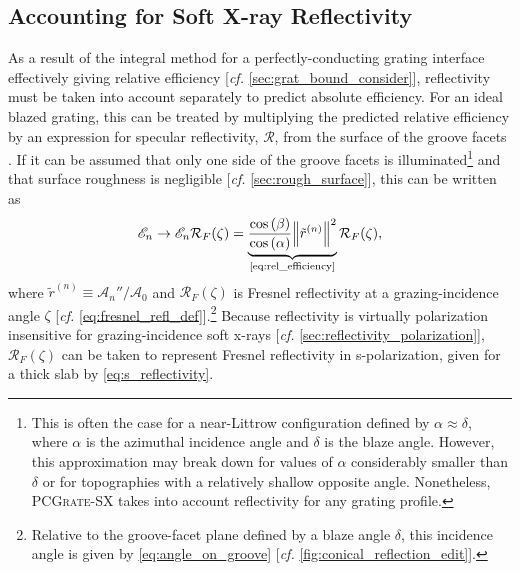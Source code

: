 \subsection{Accounting for Soft X-ray Reflectivity}\label{sec:refl_account} 
As a result of the integral method for a perfectly-conducting grating interface effectively giving relative efficiency [\emph{cf.\@} \cref{sec:grat_bound_consider}], reflectivity must be taken into account separately to predict absolute efficiency. 
For an ideal blazed grating, this can be treated by multiplying the predicted relative efficiency by an expression for specular reflectivity, $\mathcal{R}$, from the surface of the groove facets \cite{antonakakis14}. 
If it can be assumed that only one side of the groove facets is illuminated\footnote{This is often the case for a near-Littrow configuration defined by $\alpha \approx \delta$, where $\alpha$ is the azimuthal incidence angle and $\delta$ is the blaze angle. However, this approximation may break down for values of $\alpha$ considerably smaller than $\delta$ or for topographies with a relatively shallow opposite angle. Nonetheless, \textsc{PCGrate-SX} takes into account reflectivity for any grating profile.} and that surface roughness is negligible [\emph{cf.\@} \cref{sec:rough_surface}], this can be written as 
\begin{equation}\label{eq:absolute_eff_approx}
 \mathscr{E}_n \to \mathscr{E}_n \mathcal{R}_F (\zeta) = \underbrace{\frac{\cos \left( \beta \right)}{\cos \left( \alpha \right)} \norm{\tilde{r}^{(n)}}^2}_{\text{\cref{eq:rel_efficiency}}} \mathcal{R}_F (\zeta) ,
 \end{equation}
where $\tilde{r}^{(n)} \equiv \mathcal{A}_n'' / \mathcal{A}_0$ and $\mathcal{R}_F (\zeta)$ is Fresnel reflectivity at a grazing-incidence angle $\zeta$ [\emph{cf.\@} \cref{eq:fresnel_refl_def}].\footnote{Relative to the groove-facet plane defined by a blaze angle $\delta$, this incidence angle is given by \cref{eq:angle_on_groove} [\emph{cf.\@} \cref{fig:conical_reflection_edit}].} 
Because reflectivity is virtually polarization insensitive for grazing-incidence soft x-rays [\emph{cf.\@} \cref{sec:reflectivity_polarization}], $\mathcal{R}_F (\zeta)$ can be taken to represent Fresnel reflectivity in s-polarization, given for a thick slab by \cref{eq:s_reflectivity}. 

